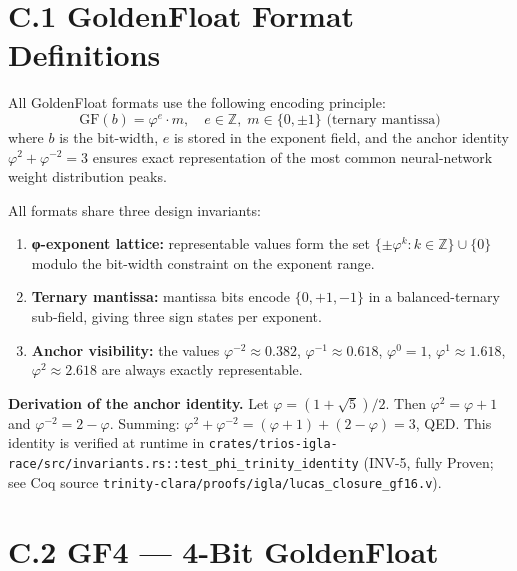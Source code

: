 \section*{C.1 GoldenFloat Format Definitions}

All GoldenFloat formats use the following encoding principle:
\begin{equation}
\text{GF}(b) = \varphi^{e} \cdot m, \quad e \in \mathbb{Z},\;
m \in \{0, \pm 1\}
\text{ (ternary mantissa)}
\label{eq:gf-def}
\end{equation}
where $b$ is the bit-width, $e$ is stored in the exponent field, and the
anchor identity $\varphi^2 + \varphi^{-2} = 3$ ensures exact
representation of the most common neural-network weight distribution
peaks.

All formats share three design invariants:
\begin{enumerate}
  \item \textbf{φ-exponent lattice:} representable values form the set
        $\{ \pm\varphi^k : k \in \mathbb{Z}\} \cup \{0\}$ modulo the
        bit-width constraint on the exponent range.
  \item \textbf{Ternary mantissa:} mantissa bits encode $\{0, +1, -1\}$
        in a balanced-ternary sub-field, giving three sign states per
        exponent.
  \item \textbf{Anchor visibility:} the values
        $\varphi^{-2} \approx 0.382$,
        $\varphi^{-1} \approx 0.618$,
        $\varphi^0 = 1$,
        $\varphi^1 \approx 1.618$,
        $\varphi^2 \approx 2.618$ are always exactly representable.
\end{enumerate}

\noindent\textbf{Derivation of the anchor identity.}  Let
$\varphi = (1+\sqrt{5})/2$.  Then $\varphi^2 = \varphi + 1$ and
$\varphi^{-2} = 2 - \varphi$.  Summing:
$\varphi^2 + \varphi^{-2} = (\varphi+1) + (2-\varphi) = 3$, QED.
This identity is verified at runtime in
\texttt{crates/trios-igla-race/src/invariants.rs::test\_phi\_trinity\_identity}
(INV-5, fully Proven; see Coq source
\texttt{trinity-clara/proofs/igla/lucas\_closure\_gf16.v}).

\section*{C.2 GF4 --- 4-Bit GoldenFloat}

